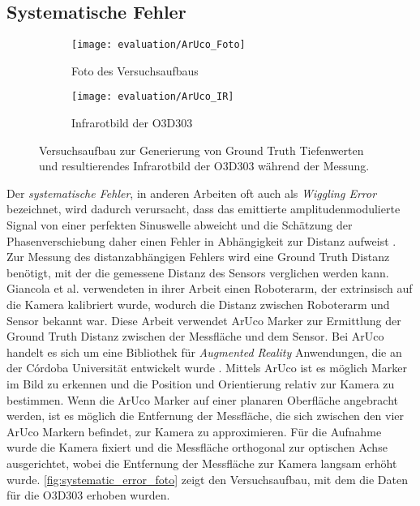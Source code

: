 \documentclass[thesis.tex]{subfiles}
\begin{document}
\subsection{Systematische Fehler}\label{sec:systematoc_error}
%
\begin{figure}[h!]
\centering
\begin{subfigure}{.49\textwidth}
    \centering
    \texttt{[image: evaluation/ArUco\_Foto]}
    \caption{Foto des Versuchsaufbaus}
    \label{fig:systematic_error_foto}
\end{subfigure}%
\begin{subfigure}{.49\textwidth}
    \centering
    \texttt{[image: evaluation/ArUco\_IR]}
    \caption{Infrarotbild der O3D303}
    \label{fig:systematic_error_O3D303_ir}
\end{subfigure}
\caption{Versuchsaufbau zur Generierung von Ground Truth Tiefenwerten und resultierendes Infrarotbild der O3D303 während der Messung.}
\label{fig:systematoc_error_experiment}
\end{figure}

Der \emph{systematische Fehler}, in anderen Arbeiten oft auch als \emph{Wiggling Error} bezeichnet, wird dadurch verursacht, dass das emittierte amplitudenmodulierte Signal von einer perfekten Sinuswelle abweicht und die Schätzung der Phasenverschiebung daher einen Fehler in Abhängigkeit zur Distanz aufweist \cite{bib:Giancola2018}. Zur Messung des distanzabhängigen Fehlers wird eine Ground Truth Distanz benötigt, mit der die gemessene Distanz des Sensors verglichen werden kann. Giancola et al. \cite{bib:Giancola2018} verwendeten in ihrer Arbeit einen Roboterarm, der extrinsisch auf die Kamera kalibriert wurde, wodurch die Distanz zwischen Roboterarm und Sensor bekannt war. Diese Arbeit verwendet ArUco Marker zur Ermittlung der Ground Truth Distanz zwischen der Messfläche und dem Sensor. Bei ArUco handelt es sich um eine Bibliothek für \emph{Augmented Reality} Anwendungen, die an der Córdoba Universität entwickelt wurde \cite{bib:Ramirez2018}\cite{bib:Garrido-Jurado2015}. Mittels ArUco ist es möglich Marker im Bild zu erkennen und die Position und Orientierung relativ zur Kamera zu bestimmen. Wenn die ArUco Marker auf einer planaren Oberfläche angebracht werden, ist es möglich die Entfernung der Messfläche, die sich zwischen den vier ArUco Markern befindet, zur Kamera zu approximieren. Für die Aufnahme wurde die Kamera fixiert und die Messfläche orthogonal zur optischen Achse ausgerichtet, wobei die Entfernung der Messfläche zur Kamera langsam erhöht wurde. \autoref{fig:systematic_error_foto} zeigt den Versuchsaufbau, mit dem die Daten für die O3D303 erhoben wurden. 
\end{document}
